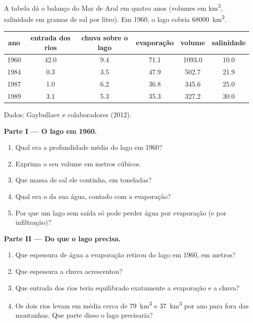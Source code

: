 \begin{problem}
\label{pb:g10:freshwater-resources:1}
A tabela dá o balanço do Mar de Aral em quatro anos (volumes em
\unit{km^3}, salinidade em gramas de sal por litro). Em 1960, o lago cobria
\qty{68000}{km^2}.
\begin{center}
\small
\begin{tabular}{|c|c|c|c|c|c|}
\hline
ano & entrada dos rios & chuva sobre o lago & evaporação & volume & salinidade \\ \hline
1960 & 42.0 & 9.4 & 71.1 & 1093.0 & 10.0 \\ \hline
1984 & 0.3 & 3.5 & 47.9 & 502.7 & 21.9 \\ \hline
1987 & 1.0 & 6.2 & 36.8 & 345.6 & 25.0 \\ \hline
1989 & 3.1 & 5.3 & 35.3 & 327.2 & 30.0 \\ \hline
\end{tabular}

{\small Dados: Gaybullaev e colaboradores (2012).}
\end{center}

\medskip
\noindent\textbf{Parte I --- O lago em 1960.}
\begin{enumerate}
  \item Qual era a profundidade média do lago em 1960?
  \item Exprima o seu volume em metros cúbicos.
  \item Que massa de sal ele continha, em toneladas?
  \item Qual era o  da sua água, contado com a
        evaporação?
  \item Por que um lago sem saída só pode perder água por evaporação (e por
        infiltração)?
\end{enumerate}

\medskip
\noindent\textbf{Parte II --- Do que o lago precisa.}
\begin{enumerate}[resume]
  \item Que espessura de água a evaporação retirou do lago em 1960, em
        metros?
  \item Que espessura a chuva acrescentou?
  \item Que entrada dos rios teria equilibrado exatamente a evaporação e a
        chuva?
  \item Os dois rios levam em média cerca de \qty{79}{km^3} e
        \qty{37}{km^3} por ano para fora das montanhas. Que parte disso o
        lago precisaria?
\end{enumerate}


\end{problem}
